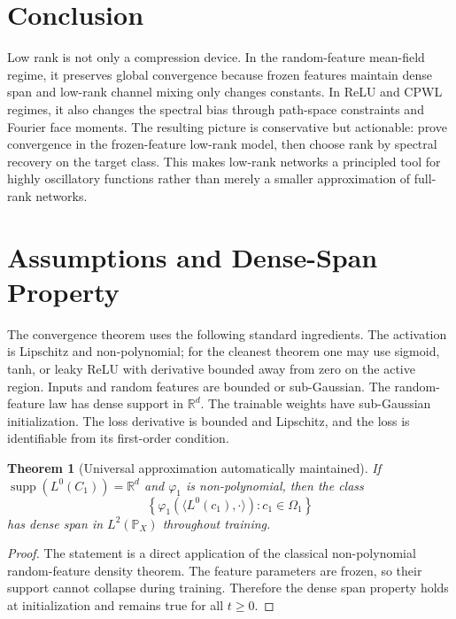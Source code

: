 \documentclass{article}
\newtheorem{theorem}{Theorem}[section]
\newcommand{\R}{\mathbb{R}}
\newcommand{\Pp}{\mathbb{P}}
\begin{document}
\section{Conclusion}

Low rank is not only a compression device. In the random-feature mean-field regime, it preserves global convergence because frozen features maintain dense span and low-rank channel mixing only changes constants. In ReLU and CPWL regimes, it also changes the spectral bias through path-space constraints and Fourier face moments. The resulting picture is conservative but actionable: prove convergence in the frozen-feature low-rank model, then choose rank by spectral recovery on the target class. This makes low-rank networks a principled tool for highly oscillatory functions rather than merely a smaller approximation of full-rank networks.

\appendix

\section{Assumptions and Dense-Span Property}
\label{app:assumptions}

The convergence theorem uses the following standard ingredients. The activation is Lipschitz and non-polynomial; for the cleanest theorem one may use sigmoid, tanh, or leaky ReLU with derivative bounded away from zero on the active region. Inputs and random features are bounded or sub-Gaussian. The random-feature law has dense support in $\R^d$. The trainable weights have sub-Gaussian initialization. The loss derivative is bounded and Lipschitz, and the loss is identifiable from its first-order condition.

\begin{theorem}[Universal approximation automatically maintained]
\label{thm:uap-automatic}
If $\operatorname{supp}(L^0(C_1))=\R^d$ and $\varphi_1$ is non-polynomial, then the class
\begin{equation}
\left\{\varphi_1\left(\langle L^0(c_1),\cdot\rangle\right):c_1\in\Omega_1\right\}
\end{equation}
has dense span in $L^2(\Pp_X)$ throughout training.
\end{theorem}

\begin{proof}
The statement is a direct application of the classical non-polynomial random-feature density theorem. The feature parameters are frozen, so their support cannot collapse during training. Therefore the dense span property holds at initialization and remains true for all $t\ge0$.
\end{proof}
\end{document}

